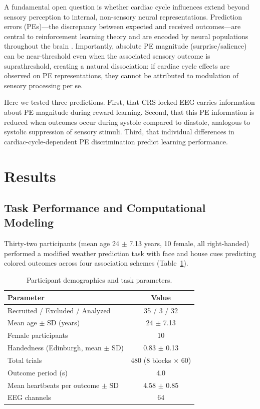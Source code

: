 \documentclass[11pt]{article}
\begin{document}
A fundamental open question is whether cardiac cycle influences extend beyond sensory perception to internal, non-sensory neural representations. Prediction errors (PEs)---the discrepancy between expected and received outcomes---are central to reinforcement learning theory \citep{rescorla1972theory, sutton1998reinforcement} and are encoded by neural populations throughout the brain \citep{schultz1997neural}. Importantly, absolute PE magnitude (surprise/salience) can be near-threshold even when the associated sensory outcome is suprathreshold, creating a natural dissociation: if cardiac cycle effects are observed on PE representations, they cannot be attributed to modulation of sensory processing per se.

Here we tested three predictions. First, that CRS-locked EEG carries information about PE magnitude during reward learning. Second, that this PE information is reduced when outcomes occur during systole compared to diastole, analogous to systolic suppression of sensory stimuli. Third, that individual differences in cardiac-cycle-dependent PE discrimination predict learning performance.

\section{Results}

\subsection{Task Performance and Computational Modeling}

Thirty-two participants (mean age 24 $\pm$ 7.13 years, 10 female, all right-handed) performed a modified weather prediction task \citep{weather_prediction1994} with face and house cues predicting colored outcomes across four association schemes (Table~\ref{tab:participants}).

\begin{table}[H]
\centering
\caption{Participant demographics and task parameters.}
\label{tab:participants}
\begin{tabular}{lc}
\toprule
Parameter & Value \\
\midrule
Recruited / Excluded / Analyzed & 35 / 3 / 32 \\
Mean age $\pm$ SD (years) & 24 $\pm$ 7.13 \\
Female participants & 10 \\
Handedness (Edinburgh, mean $\pm$ SD) & 0.83 $\pm$ 0.13 \\
Total trials & 480 (8 blocks $\times$ 60) \\
Outcome period (s) & 4.0 \\
Mean heartbeats per outcome $\pm$ SD & 4.58 $\pm$ 0.85 \\
EEG channels & 64 \\
\bottomrule
\end{tabular}
\end{table}
\end{document}

